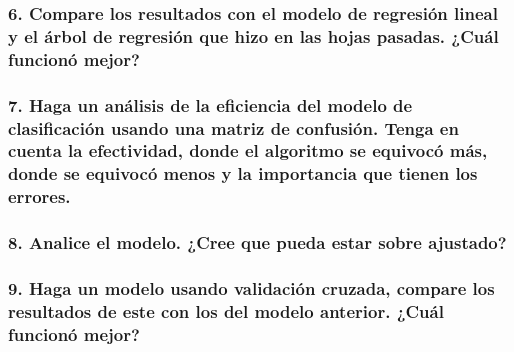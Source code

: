 \documentclass[
]{article}
\begin{document}
\hypertarget{compare-los-resultados-con-el-modelo-de-regresiuxf3n-lineal-y-el-uxe1rbol-de-regresiuxf3n-que-hizo-en-las-hojas-pasadas.-cuuxe1l-funcionuxf3-mejor}{%
\subsubsection{6. Compare los resultados con el modelo de regresión
lineal y el árbol de regresión que hizo en las hojas pasadas. ¿Cuál
funcionó
mejor?}\label{compare-los-resultados-con-el-modelo-de-regresiuxf3n-lineal-y-el-uxe1rbol-de-regresiuxf3n-que-hizo-en-las-hojas-pasadas.-cuuxe1l-funcionuxf3-mejor}}

\hypertarget{haga-un-anuxe1lisis-de-la-eficiencia-del-modelo-de-clasificaciuxf3n-usando-una-matriz-de-confusiuxf3n.-tenga-en-cuenta-la-efectividad-donde-el-algoritmo-se-equivocuxf3-muxe1s-donde-se-equivocuxf3-menos-y-la-importancia-que-tienen-los-errores.}{%
\subsubsection{7. Haga un análisis de la eficiencia del modelo de
clasificación usando una matriz de confusión. Tenga en cuenta la
efectividad, donde el algoritmo se equivocó más, donde se equivocó menos
y la importancia que tienen los
errores.}\label{haga-un-anuxe1lisis-de-la-eficiencia-del-modelo-de-clasificaciuxf3n-usando-una-matriz-de-confusiuxf3n.-tenga-en-cuenta-la-efectividad-donde-el-algoritmo-se-equivocuxf3-muxe1s-donde-se-equivocuxf3-menos-y-la-importancia-que-tienen-los-errores.}}

\hypertarget{analice-el-modelo.-cree-que-pueda-estar-sobre-ajustado}{%
\subsubsection{8. Analice el modelo. ¿Cree que pueda estar sobre
ajustado?}\label{analice-el-modelo.-cree-que-pueda-estar-sobre-ajustado}}

\hypertarget{haga-un-modelo-usando-validaciuxf3n-cruzada-compare-los-resultados-de-este-con-los-del-modelo-anterior.-cuuxe1l-funcionuxf3-mejor}{%
\subsubsection{9. Haga un modelo usando validación cruzada, compare los
resultados de este con los del modelo anterior. ¿Cuál funcionó
mejor?}\label{haga-un-modelo-usando-validaciuxf3n-cruzada-compare-los-resultados-de-este-con-los-del-modelo-anterior.-cuuxe1l-funcionuxf3-mejor}}
\end{document}

